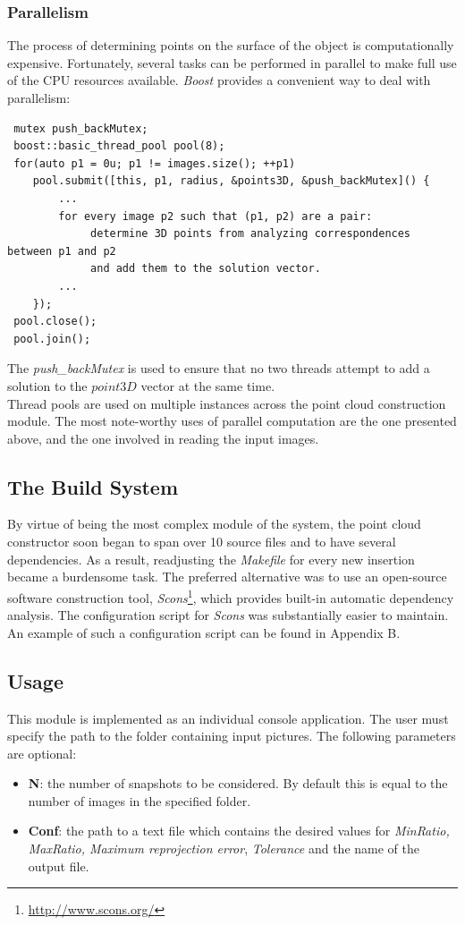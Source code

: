 \documentclass[12pt,a4paper,twoside,openright]{report}
\begin{document}
\subsubsection{Parallelism}
The process of determining points on the surface of the object is computationally expensive. Fortunately, several tasks can be performed in parallel to make full use of the CPU resources available. \emph{Boost} provides a convenient way to deal with parallelism: \\
\begin{verbatim}
 mutex push_backMutex;
 boost::basic_thread_pool pool(8);
 for(auto p1 = 0u; p1 != images.size(); ++p1)
    pool.submit([this, p1, radius, &points3D, &push_backMutex]() {
    	...
    	for every image p2 such that (p1, p2) are a pair:
    		 determine 3D points from analyzing correspondences between p1 and p2
    		 and add them to the solution vector.
    	...
    });
 pool.close();
 pool.join();
\end{verbatim}
The \emph{push\_backMutex} is used to ensure that no two threads attempt to add a solution to the $point3D$ vector at the same time.\\
Thread pools are used on multiple instances across the point cloud construction module. The most note-worthy uses of parallel computation are the one presented above, and the one involved in reading the input images.

\subsection{The Build System}
By virtue of being the most complex module of the system, the point cloud constructor soon began to span over 10 source files and to have several dependencies. As a result, readjusting the \emph{Makefile} for every new insertion became a burdensome task. The preferred alternative was to use an open-source software construction tool, \emph{Scons}\footnote{\url{http://www.scons.org/}}, which provides built-in automatic dependency analysis. The configuration script for \emph{Scons} was substantially easier to maintain. An example of such a configuration script can be found in Appendix B.

\subsection{Usage}
This module is implemented as an individual console application. The user must specify the path to the folder containing input pictures. The following parameters are optional:
\begin{itemize}
\item \textbf{N}: the number of snapshots to be considered. By default this is equal to the number of images in the specified folder. 
\item \textbf{Conf}: the path to a text file which contains the desired values for \emph{MinRatio, MaxRatio, Maximum reprojection error}, \emph{Tolerance} and the name of the output file.
\end{itemize}
\end{document}
